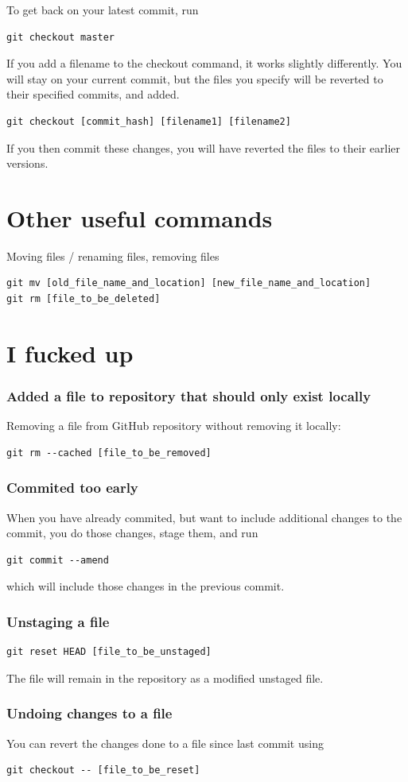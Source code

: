 \documentclass[12p,a4paper]{article}
\begin{document}
To get back on your latest commit, run
\begin{verbatim}
git checkout master
\end{verbatim}

If you add a filename to the checkout command, it works slightly differently. You will stay on your current commit, but the files you specify will be reverted to their specified commits, and added.
\begin{verbatim}
git checkout [commit_hash] [filename1] [filename2]
\end{verbatim}
If you then commit these changes, you will have reverted the files to their earlier versions.


\section{Other useful commands}
Moving files / renaming files, removing files
\begin{verbatim}
git mv [old_file_name_and_location] [new_file_name_and_location]
git rm [file_to_be_deleted]
\end{verbatim}

\section{I fucked up}
\subsubsection{Added a file to repository that should only exist locally}
Removing a file from GitHub repository without removing it locally:
\begin{verbatim}
git rm --cached [file_to_be_removed]
\end{verbatim}


\subsubsection{Commited too early}
When you have already commited, but want to include additional changes to the commit, you do those changes, stage them, and run
\begin{verbatim}
git commit --amend
\end{verbatim}
which will include those changes in the previous commit.


\subsubsection{Unstaging a file}
\begin{verbatim}
git reset HEAD [file_to_be_unstaged]
\end{verbatim}
The file will remain in the repository as a modified unstaged file.


\subsubsection{Undoing changes to a file}
You can revert the changes done to a file since last commit using
\begin{verbatim}
git checkout -- [file_to_be_reset]
\end{verbatim}
\end{document}
